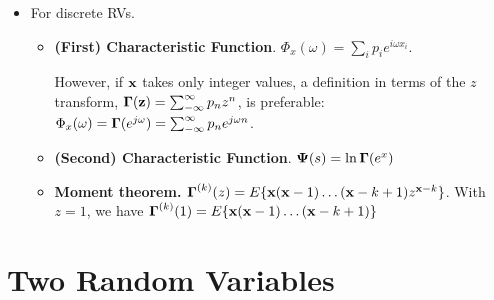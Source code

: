 \documentclass[a4paper, oneside]{book}
\begin{document}
\begin{itemize}
\item For discrete RVs.
	\begin{itemize}
	\item \textbf{(First) Characteristic Function}. $\Phi_x(\omega) = \sum_i p_i e^{i \omega x_i}$.
	
	However, if $\mathbf x$ takes only integer values, a definition in terms of the $z$ transform, $\boldsymbol \Gamma(\mathbf z) = \sum_{-\infty}^\infty p_n z^n$, is preferable: $\Phi_x(\omega) = \boldsymbol{\Gamma}(e^{j\omega}) = \sum_{-\infty}^{\infty} p_n e^{j\omega n} $.
	
	\item \textbf{(Second) Characteristic Function}. $\boldsymbol{\Psi}(s) = \ln \boldsymbol\Gamma (e^x)$
	\item \textbf{Moment theorem.} $\boldsymbol \Gamma^{(k)}(z) = E\{\mathbf x(\mathbf x -1)\hdots(\mathbf x-k+1)z^{\mathbf x-k}\}$. With $z=1$, we have $\boldsymbol \Gamma^{(k)}(1) = E\{\mathbf x(\mathbf x -1)\hdots(\mathbf x-k+1)\}$
	\end{itemize}
\end{itemize}
























\chapter{Two Random Variables} 
\end{document}
